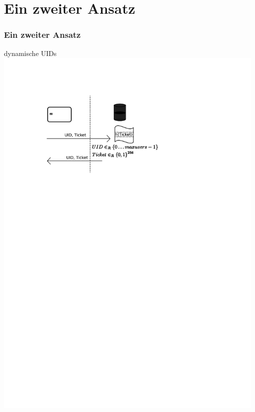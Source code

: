 \section{Ein zweiter Ansatz}
\begin{frame}
	\frametitle{Ein zweiter Ansatz}
	dynamische UIDs
	\includegraphics[scale=0.75]{ansatz2ablauf.pdf}
\end{frame}



